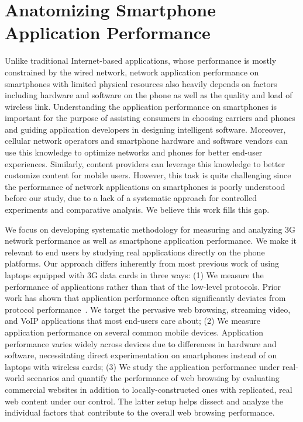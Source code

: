 \chapter{Anatomizing Smartphone Application Performance}
\label{chap:app}

Unlike traditional Internet-based applications, whose performance is mostly constrained by the wired network, network application performance on smartphones with limited physical resources also heavily depends on factors including hardware and software on the phone as well as the quality and load of wireless link. Understanding the application performance on smartphones is important for the purpose of assisting consumers in choosing carriers and phones and guiding application developers in designing intelligent software. Moreover, cellular network operators and smartphone hardware and software vendors can use this knowledge to optimize networks and phones for better end-user experiences. Similarly, content providers can leverage this knowledge to better customize content for mobile users. However, this task is quite challenging since the performance of network applications on smartphones is poorly understood before our study, due to a lack of a systematic approach for controlled experiments and comparative analysis. We believe this work fills this gap.

We focus on developing systematic methodology for measuring and analyzing 3G network performance as well as smartphone application performance. We make it relevant to end users by studying real applications directly on the phone platforms. Our approach differs inherently from most previous work of using laptops equipped with 3G data cards in three ways: (1) We measure the performance of applications rather than that of the low-level protocols. Prior work has shown that application performance often significantly deviates from protocol performance~\cite{Zhuang:A3:Mobicom2006}. We target the pervasive web browsing, streaming video, and VoIP applications that most end-users care about; (2) We measure application performance on several common mobile devices. Application performance varies widely across devices due to differences in hardware and software, necessitating direct experimentation on smartphones instead of on laptops with wireless cards; (3) We study the application performance under real-world scenarios and quantify the performance of web browsing by evaluating commercial websites in addition to locally-constructed ones with replicated, real web content under our control. The latter setup helps dissect and analyze the individual factors that contribute to the overall web browsing performance.

